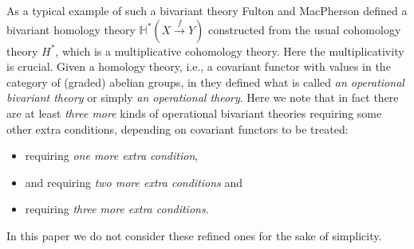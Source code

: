 \documentclass[a4paper]{amsart}
\begin{document}
As a typical example of such a bivariant theory Fulton and MacPherson defined a bivariant homology theory $\mathbb H^*(X \xrightarrow f Y)$ constructed from the usual cohomology theory $H^*$, which is a multiplicative cohomology theory. Here the multiplicativity is crucial. Given a homology theory, i.e., a covariant functor with values in the category of (graded) abelian groups, in \cite[\S 8.1]{FM} they defined what is called \emph{an operational bivariant theory} or simply \emph{an operational theory}. 
Here we note that in fact there are at least \emph{three more} kinds of operational bivariant theories requiring some other extra conditions, depending on covariant functors to be treated:
\begin{itemize}
\item \cite [\S 8.3]{FM} requiring \emph{one more extra condition}, 
\item \cite[\S 17.1]{Ful} and \cite{AP} requiring \emph{two more extra conditions} and 
\item \cite{GK} requiring \emph{three more extra conditions}.
\end{itemize}
In this paper we do not consider these refined ones for the sake of simplicity.
\end{document}
